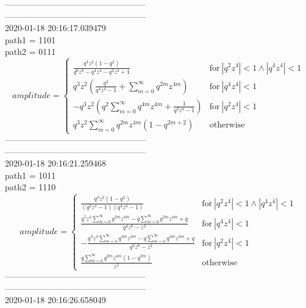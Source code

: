 \documentclass{jsreport}
\begin{document}
--------------------------------------------------\\
--------------------------------------------------\\
2020-01-18 20:16:17.039479\\
path1 = 1101\\
path2 = 0111\\
$$amplitude = \begin{cases} \frac{q^{3} z^{2} \left(1 - q^{2}\right)}{q^{6} z^{8} - q^{4} z^{4} - q^{2} z^{4} + 1} & \text{for}\: \left|{q^{2} z^{4}}\right| < 1 \wedge \left|{q^{4} z^{4}}\right| < 1 \\q^{3} z^{2} \left(\frac{q^{2}}{q^{4} z^{4} - 1} + \sum_{m=0}^{\infty} q^{2 m} z^{4 m}\right) & \text{for}\: \left|{q^{4} z^{4}}\right| < 1 \\- q^{3} z^{2} \left(q^{2} \sum_{m=0}^{\infty} q^{4 m} z^{4 m} + \frac{1}{q^{2} z^{4} - 1}\right) & \text{for}\: \left|{q^{2} z^{4}}\right| < 1 \\q^{3} z^{2} \sum_{m=0}^{\infty} q^{2 m} z^{4 m} \left(1 - q^{2 m + 2}\right) & \text{otherwise} \end{cases}$$
--------------------------------------------------\\
--------------------------------------------------\\
2020-01-18 20:16:21.259468\\
path1 = 1011\\
path2 = 1110\\
$$amplitude = \begin{cases} \frac{q^{3} z^{2} \left(1 - q^{2}\right)}{\left(q^{2} z^{4} - 1\right) \left(q^{4} z^{4} - 1\right)} & \text{for}\: \left|{q^{2} z^{4}}\right| < 1 \wedge \left|{q^{4} z^{4}}\right| < 1 \\\frac{q^{5} z^{4} \sum_{m=0}^{\infty} q^{2 m} z^{4 m} - q \sum_{m=0}^{\infty} q^{2 m} z^{4 m} + q}{q^{4} z^{6} - z^{2}} & \text{for}\: \left|{q^{4} z^{4}}\right| < 1 \\- \frac{q^{3} z^{4} \sum_{m=0}^{\infty} q^{4 m} z^{4 m} - q \sum_{m=0}^{\infty} q^{4 m} z^{4 m} + q}{q^{2} z^{6} - z^{2}} & \text{for}\: \left|{q^{2} z^{4}}\right| < 1 \\\frac{q \sum_{m=0}^{\infty} q^{2 m} z^{4 m} \left(1 - q^{2 m}\right)}{z^{2}} & \text{otherwise} \end{cases}$$
--------------------------------------------------\\
--------------------------------------------------\\
2020-01-18 20:16:26.658049\\
\end{document}
